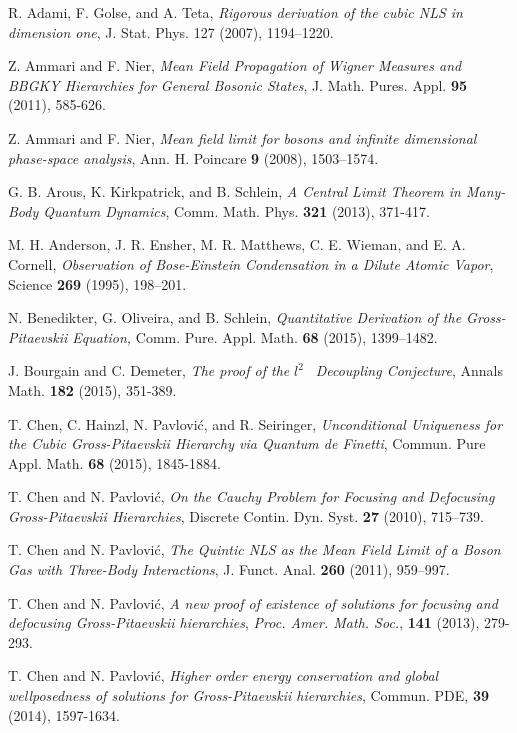 \documentclass[12pt,letterpaper,leqno]{amsart}
\theoremstyle{plain}
\numberwithin{equation}{section}
\numberwithin{theorem}{section}
\numberwithin{proposition}{section}
\numberwithin{lemma}{section}
\numberwithin{corollary}{section}
\begin{document}
\begin{thebibliography}{99}
 R. Adami, F. Golse, and A. Teta, \emph{Rigorous derivation of
the cubic NLS in dimension one}, J. Stat. Phys. 127 (2007), 1194--1220.

 Z. Ammari and F. Nier, \emph{Mean Field Propagation of
Wigner Measures and BBGKY Hierarchies for General Bosonic States}, J. Math.
Pures. Appl. \textbf{95} (2011), 585-626.

 Z. Ammari and F. Nier, \emph{Mean field limit for bosons
and infinite dimensional phase-space analysis}, Ann. H. Poincare \textbf{9}
(2008), 1503--1574.

 G. B. Arous, K. Kirkpatrick, and B. Schlein, \emph{A Central
Limit Theorem in Many-Body Quantum Dynamics}, Comm. Math. Phys. \textbf{321}
(2013), 371-417.

 M. H. Anderson, J. R. Ensher, M. R. Matthews, C. E.
Wieman, and E. A. Cornell, \emph{Observation of Bose-Einstein Condensation
in a Dilute Atomic Vapor}, Science \textbf{269 }(1995), 198--201.

 N. Benedikter, G. Oliveira, and B. Schlein, \emph{%
Quantitative Derivation of the Gross-Pitaevskii Equation, }Comm. Pure. Appl.
Math. \textbf{68} (2015), 1399--1482.

 J. Bourgain and C. Demeter, \emph{The proof of the }$l^{2}$%
\emph{\ Decoupling Conjecture}, Annals Math. \textbf{182} (2015), 351-389.{}

 T. Chen, C. Hainzl, N. Pavlovi\'{c}, and R.
Seiringer, \emph{Unconditional Uniqueness for the Cubic Gross-Pitaevskii
Hierarchy via Quantum de Finetti}, Commun. Pure Appl. Math. \textbf{68}
(2015), 1845-1884.

 T. Chen and N. Pavlovi\'{c}, \emph{On the Cauchy
Problem for Focusing and Defocusing Gross-Pitaevskii Hierarchies}, Discrete
Contin. Dyn. Syst. \textbf{27} (2010), 715--739.

 T. Chen and N. Pavlovi\'{c}, \emph{The Quintic NLS as
the Mean Field Limit of a Boson Gas with Three-Body Interactions}, J. Funct.
Anal. \textbf{260} (2011), 959--997.

 T. Chen and N. Pavlovi\'{c}, \emph{A new proof of
existence of solutions for focusing and defocusing Gross-Pitaevskii
hierarchies}, \emph{Proc. Amer. Math. Soc.}, \textbf{141} (2013), 279-293.

 T. Chen and N. Pavlovi\'{c}, \emph{Higher order energy
conservation and global wellposedness of solutions for Gross-Pitaevskii
hierarchies}, Commun. PDE, \textbf{39} (2014), 1597-1634.


\end{thebibliography}
\end{document}

